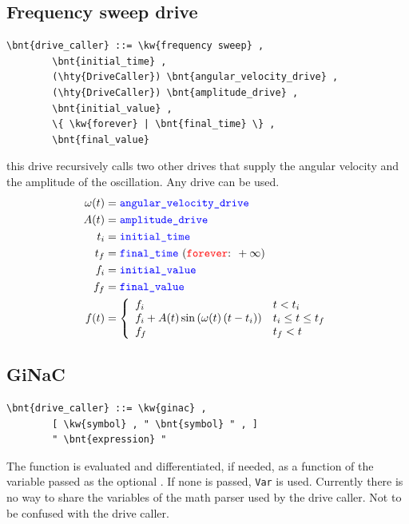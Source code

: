 \subsection{Frequency sweep drive}
\begin{Verbatim}[commandchars=\\\{\}]
    \bnt{drive_caller} ::= \kw{frequency sweep} ,
        \bnt{initial_time} ,
        (\hty{DriveCaller}) \bnt{angular_velocity_drive} ,
        (\hty{DriveCaller}) \bnt{amplitude_drive} ,
        \bnt{initial_value} ,
        \{ \kw{forever} | \bnt{final_time} \} ,
        \bnt{final_value}
\end{Verbatim}
this drive recursively calls two other drives that supply the angular velocity 
and the amplitude of the oscillation. Any drive can be used.
\begin{align}
	\omega(t) &= \nt{angular\_velocity\_drive}
	\nonumber \\
	A(t) &= \nt{amplitude\_drive}
	\nonumber \\
	t_i &= \nt{initial\_time}
	\nonumber \\
	t_f &= \nt{final\_time} \ (\text{\kw{forever}: } +\infty)
	\nonumber \\
	f_i &= \nt{initial\_value}
	\nonumber \\
	f_f &= \nt{final\_value}
	\nonumber \\
	f(t) &= \lcubr{\matr{ll}{
		f_i & t < t_i
		\\
		f_i + A(t) \sin\plbr{ \omega(t)\plbr{t - t_i} } & t_i \le t \le t_f
		\\
		f_f & t_f < t
	}}
\end{align}

\subsection{GiNaC}\label{sec:DriveCaller:GINAC}
\begin{Verbatim}[commandchars=\\\{\}]
    \bnt{drive_caller} ::= \kw{ginac} ,
        [ \kw{symbol} , " \bnt{symbol} " , ]
        " \bnt{expression} "
\end{Verbatim}
The function  is evaluated and differentiated, if needed,
as a function of the variable passed as the optional .
If none is passed, \texttt{Var} is used.
Currently there is no way to share the variables of the math parser
used by the  drive caller.
Not to be confused with the  drive caller.

